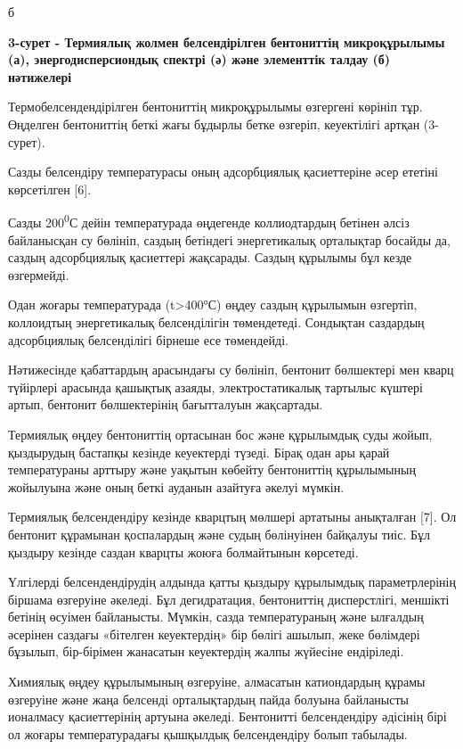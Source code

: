 б

\textbf{3-сурет - Термиялық жолмен белсендірілген бентониттің
микроқұрылымы (а), энергодисперсиондық спектрі (ә) және элементтік
талдау (б) нәтижелері}

Термобелсендендірілген бентониттің микроқұрылымы өзгергені көрініп тұр.
Өңделген бентониттің беткі жағы бұдырлы бетке өзгеріп, кеуектілігі
артқан (3-сурет).

Сазды белсендіру температурасы оның адсорбциялық қасиеттеріне әсер
ететіні көрсетілген {[}6{]}.

Сазды 200\textsuperscript{0}С дейін температурада өңдегенде
коллиодтардың бетінен әлсіз байланысқан су бөлініп, саздың бетіндегі
энергетикалық орталықтар босайды да, саздың адсорбциялық қасиеттері
жақсарады. Саздың құрылымы бұл кезде өзгермейді.

Одан жоғары температурада (t\textgreater400°С) өңдеу саздың құрылымын
өзгертіп, коллоидтың энергетикалық белсенділігін төмендетеді. Сондықтан
саздардың адсорбциялық белсенділігі бірнеше есе төмендейді.

Нәтижесінде қабаттардың арасындағы су бөлініп, бентонит бөлшектері мен
кварц түйірлері арасында қашықтық азаяды, электростатикалық тартылыс
күштері артып, бентонит бөлшектерінің бағытталуын жақсартады.

Термиялық өңдеу бентониттің ортасынан бос және құрылымдық суды жойып,
қыздырудың бастапқы кезінде кеуектерді түзеді. Бірақ одан ары қарай
температураны арттыру және уақытын көбейту бентониттің құрылымының
жойылуына және оның беткі ауданын азайтуға әкелуі мүмкін.

Термиялық белсендендіру кезінде кварцтың мөлшері артатыны анықталған
{[}7{]}. Ол бентонит құрамынан қоспалардың және судың бөлінуінен
байқалуы тиіс. Бұл қыздыру кезінде саздан кварцты жоюға болмайтынын
көрсетеді.

Үлгілерді белсендендірудің алдында қатты қыздыру құрылымдық
параметрлерінің біршама өзгеруіне әкеледі. Бұл дегидратация, бентониттің
дисперстлігі, меншікті бетінің өсуімен байланысты. Мүмкін, сазда
температураның және ылғалдың әсерінен саздағы «бітелген кеуектердің» бір
бөлігі ашылып, жеке бөлімдері бұзылып, бір-бірімен жанасатын кеуектердің
жалпы жүйесіне ендіріледі.

Химиялық өңдеу құрылымының өзгеруіне, алмасатын катиондардың құрамы
өзгеруіне және жаңа белсенді орталықтардың пайда болуына байланысты
ионалмасу қасиеттерінің артуына әкеледі. Бентонитті белсендендіру
әдісінің бірі ол жоғары температурадағы қышқылдық белсендендіру болып
табылады.

